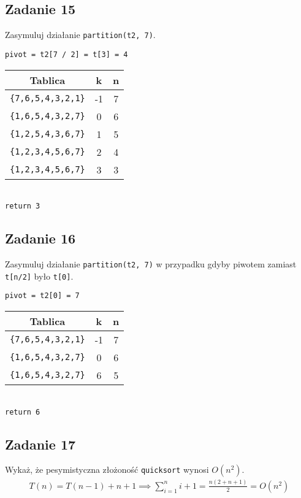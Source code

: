 \documentclass{article}
\begin{document}
\subsection*{Zadanie 15}
Zasymuluj działanie \verb+partition(t2, 7)+.
\begin{center}
    \verb+pivot = t2[7 / 2] = t[3] = 4+ \\[1ex]
    \begin{tabular}{c c c}
        \textbf{Tablica}       & \textbf{k} & \textbf{n} \\
        \hline
        \verb+{7,6,5,4,3,2,1}+ & -1         & 7          \\
        \verb+{1,6,5,4,3,2,7}+ & 0          & 6          \\
        \verb+{1,2,5,4,3,6,7}+ & 1          & 5          \\
        \verb+{1,2,3,4,5,6,7}+ & 2          & 4          \\
        \verb+{1,2,3,4,5,6,7}+ & 3          & 3          \\
    \end{tabular} \\[1ex]
    \verb+return 3+
\end{center}

\subsection*{Zadanie 16}
Zasymuluj działanie \verb+partition(t2, 7)+ w przypadku gdyby piwotem zamiast \verb+t[n/2]+ było \verb+t[0]+.
\begin{center}
    \verb+pivot = t2[0] = 7+ \\[1ex]
    \begin{tabular}{c c c}
        \textbf{Tablica}       & \textbf{k} & \textbf{n} \\
        \hline
        \verb+{7,6,5,4,3,2,1}+ & -1         & 7          \\
        \verb+{1,6,5,4,3,2,7}+ & 0          & 6          \\
        \verb+{1,6,5,4,3,2,7}+ & 6          & 5          \\
    \end{tabular} \\[1ex]
    \verb+return 6+
\end{center}

\subsection*{Zadanie 17}
Wykaż, że pesymistyczna złożoność \verb+quicksort+ wynosi $O(n^2)$.
\begin{gather*}
    T(n) = T(n-1) + n + 1 \implies \sum_{i=1}^{n} i + 1 = \frac{n(2 + n + 1)}{2} = O(n^2)
\end{gather*}
\end{document}
